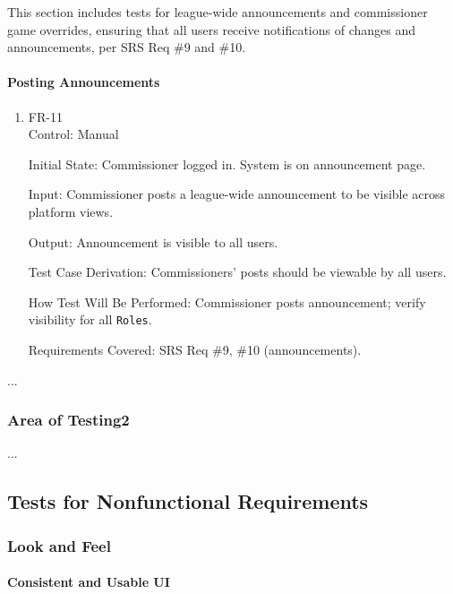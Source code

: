 \documentclass[12pt, titlepage]{article}
\begin{document}
This section includes tests for league-wide announcements and commissioner game overrides, ensuring that all users receive notifications of changes and announcements, per SRS Req \#9 and \#10.

\paragraph{Posting Announcements}

\begin{enumerate}

    \item{FR-11\\}
          Control: Manual

          Initial State: Commissioner logged in. System is on announcement page.

          Input: Commissioner posts a league-wide announcement to be visible across platform views.

          Output: Announcement is visible to all users.

          Test Case Derivation: Commissioners' posts should be viewable by all users.

          How Test Will Be Performed: Commissioner posts announcement; verify visibility for all \texttt{Roles}.

          Requirements Covered: SRS Req \#9, \#10 (announcements).
\end{enumerate}

...

\subsubsection{Area of Testing2}

...

\subsection{Tests for Nonfunctional Requirements}

\subsubsection{Look and Feel}

\paragraph{Consistent and Usable UI}
\end{document}
